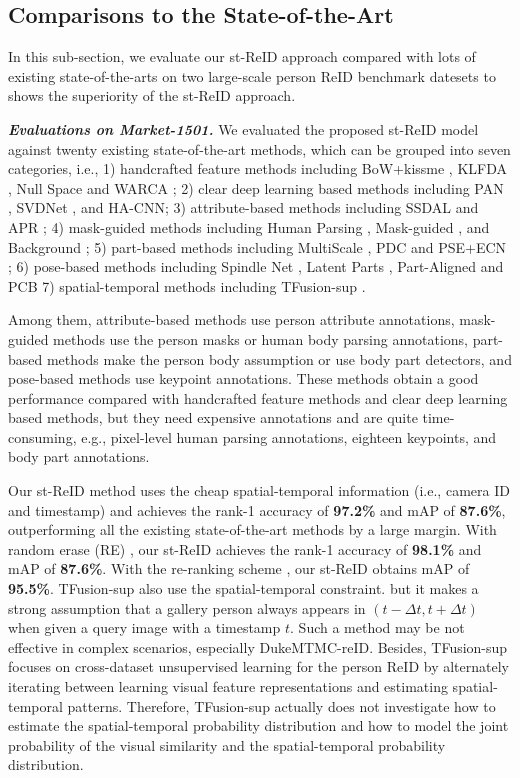 \documentclass[letterpaper]{article} %
\begin{document}
\subsection{Comparisons to the State-of-the-Art}
In this sub-section, we evaluate our st-ReID approach compared with lots of existing state-of-the-arts on two large-scale person ReID benchmark datesets to shows the superiority of the st-ReID approach.

\textbf{\emph{Evaluations on Market-1501.}} We evaluated the proposed st-ReID model against twenty existing state-of-the-art methods, which can be grouped into seven categories, i.e., 1) handcrafted feature methods including BoW+kissme \cite{zheng2015scalable}, KLFDA \cite{karanam2016arXiv}, Null Space \cite{Zhang_2016_CVPR} and WARCA \cite{Jose2016eccv}; 2) clear deep learning based methods including PAN \cite{zheng2017axkiv}, SVDNet \cite{Sun_2017_ICCV}, and HA-CNN; 3) attribute-based methods including SSDAL \cite{Su2016} and APR \cite{Lin2016}; 4) mask-guided methods including Human Parsing \cite{Kalayeh_2018_CVPR}, Mask-guided \cite{Song_2018_CVPR}, and Background \cite{Tian_2018_CVPR}; 5) part-based methods including  MultiScale \cite{chen2017cvprw}, PDC \cite{Su2017ICCV} and PSE+ECN \cite{Sarfraz_2018_CVPR}; 6) pose-based methods including Spindle Net \cite{Zhao_2017_CVPR}, Latent Parts \cite{Li_2017_CVPR}, Part-Aligned \cite{Zhao_2017_ICCV} and PCB 7) spatial-temporal methods including TFusion-sup \cite{Lv_2018_CVPR}.

Among them, attribute-based methods use person attribute annotations, mask-guided methods use the person masks or human body parsing annotations, part-based methods make the person body assumption or use body part detectors, and pose-based methods use keypoint annotations. These methods obtain a good performance compared with handcrafted feature methods and clear deep learning based methods, but they need expensive annotations and are quite time-consuming, e.g., pixel-level human parsing annotations, eighteen keypoints, and body part annotations.

Our st-ReID method uses the cheap spatial-temporal information (i.e., camera ID and timestamp) and achieves the rank-1 accuracy of \textbf{97.2\%} and mAP of \textbf{87.6\%}, outperforming all the existing state-of-the-art methods by a large margin. With random erase (RE) \cite{random_erase}, our st-ReID achieves  the rank-1 accuracy of \textbf{98.1\%} and mAP of \textbf{87.6\%}. With the re-ranking scheme \cite{Zhong_2017_CVPR}, our st-ReID obtains mAP of \textbf{95.5\%}. TFusion-sup also use the spatial-temporal constraint. but it makes a strong assumption that a gallery person always appears in $(t-\Delta t,t+\Delta t)$ when given a query image with a timestamp $t$. Such a method may be not effective in complex scenarios, especially  DukeMTMC-reID. Besides, TFusion-sup focuses on cross-dataset unsupervised learning for the person ReID by alternately iterating between learning visual feature representations and estimating spatial-temporal patterns. Therefore, TFusion-sup actually does not investigate how to estimate the spatial-temporal probability distribution and how to model the joint probability of the visual similarity and the spatial-temporal probability distribution.
\end{document}
